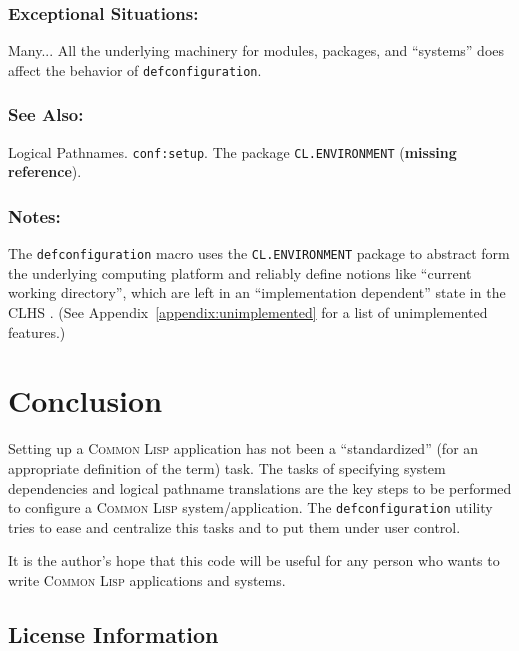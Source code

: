 \documentclass{article}
\newcommand{\CL}{\textsc{Common Lisp}}
\newcommand{\defconfiguration}{\texttt{defconfiguration}}
\newcommand{\code}[1]{\texttt{#1}}
\begin{document}
\subsubsection*{Exceptional Situations:}

Many... All the underlying machinery for modules, packages, and
``systems'' does affect the behavior of \defconfiguration{}.

\subsubsection*{See Also:}

Logical Pathnames. \code{conf:setup}. The package
\code{CL.ENVIRONMENT} (\textbf{missing reference}).

\subsubsection*{Notes:}

The \defconfiguration{} macro uses the \code{CL.ENVIRONMENT} package to
abstract form the underlying computing platform and reliably define
notions like ``current working directory'', which are left in an
``implementation dependent'' state in the CLHS
\cite{pitman96:_common_lisp_hyper}.  (See
Appendix~\ref{appendix:unimplemented} for a list of unimplemented
features.)




\section{Conclusion}

Setting up a \CL{} application has not been a ``standardized'' (for an
appropriate definition of the term) task.  The tasks of specifying
system dependencies and logical pathname translations are the key
steps to be performed to configure a \CL{} system/application.  The
\defconfiguration{} utility tries to ease and centralize this tasks
and to put them under user control.

It is the author's hope that this code will be useful for any person
who wants to write \CL{} applications and systems.


\subsection{License Information}
\end{document}
